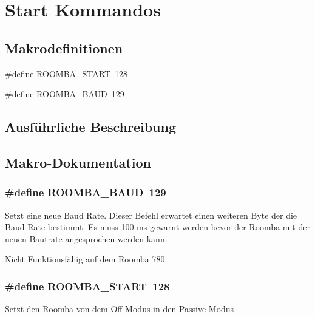 \hypertarget{group__roomba__commands__start}{\section{Start Kommandos}
\label{group__roomba__commands__start}
}
\subsection*{Makrodefinitionen}
\begin{DoxyCompactItemize}
\item 
\#define \hyperlink{group__roomba__commands__start_gaf1978389e19799d1dbf5e66303e86042}{R\-O\-O\-M\-B\-A\-\_\-\-S\-T\-A\-R\-T}~128
\item 
\#define \hyperlink{group__roomba__commands__start_gabfcf91bce948fc3990510ad173e9e2ba}{R\-O\-O\-M\-B\-A\-\_\-\-B\-A\-U\-D}~129
\end{DoxyCompactItemize}


\subsection{Ausführliche Beschreibung}


\subsection{Makro-\/\-Dokumentation}
\hypertarget{group__roomba__commands__start_gabfcf91bce948fc3990510ad173e9e2ba}{
\subsubsection[{R\-O\-O\-M\-B\-A\-\_\-\-B\-A\-U\-D}]{\setlength{\rightskip}{0pt plus 5cm}\#define R\-O\-O\-M\-B\-A\-\_\-\-B\-A\-U\-D~129}}\label{group__roomba__commands__start_gabfcf91bce948fc3990510ad173e9e2ba}
Setzt eine neue Baud Rate. Dieser Befehl erwartet einen weiteren Byte der die Baud Rate bestimmt. Es muss 100 ms gewarnt werden bevor der Roomba mit der neuen Bautrate angesprochen werden kann.

Nicht Funktionsfähig auf dem Roomba 780 \hypertarget{group__roomba__commands__start_gaf1978389e19799d1dbf5e66303e86042}{
\subsubsection[{R\-O\-O\-M\-B\-A\-\_\-\-S\-T\-A\-R\-T}]{\setlength{\rightskip}{0pt plus 5cm}\#define R\-O\-O\-M\-B\-A\-\_\-\-S\-T\-A\-R\-T~128}}\label{group__roomba__commands__start_gaf1978389e19799d1dbf5e66303e86042}
Setzt den Roomba von dem Off Modus in den Passive Modus 